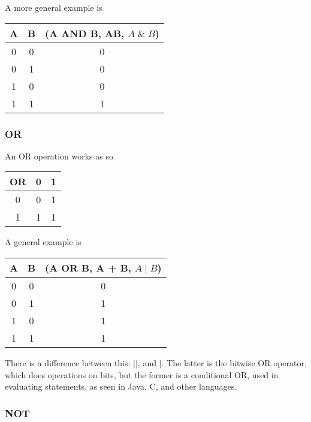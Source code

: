 \documentclass[12pt]{article}
\begin{document}
A more general example is

\begin{center}
    \begin{tabular}{|c|c|c|}
      \hline
      A & B & (A AND B, AB, $A \; \& \; B$) \\
      \hline
      0 & 0 & 0 \\
      \hline
      0 & 1 & 0 \\
      \hline
      1 & 0 & 0 \\
      \hline
      1 & 1 & 1 \\
      \hline
    \end{tabular}
    
\end{center}
\newpage
\subsubsection{OR}

An OR operation works as so

\begin{center}
    \begin{tabular}{|c|c|c|}
      \hline
      OR & 0 & 1 \\
      \hline
      0 & 0 & 1 \\
      \hline
      1 & 1 & 1 \\
      \hline
      
    \end{tabular}
\end{center}

A general example is

\begin{center}
    \begin{tabular}{|c|c|c|}
      \hline
      A & B & (A OR B, A + B, $A \; | \; B$) \\
      \hline
      0 & 0 & 0 \\
      \hline
      0 & 1 & 1 \\
      \hline
      1 & 0 & 1 \\
      \hline
      1 & 1 & 1 \\
      \hline
    \end{tabular}
\end{center}

There is a difference between this: $||$, and $|$. The latter is the bitwise OR
operator, which does operations on bits, but the former is a conditional OR,
used in evaluating statements, as seen in Java, C, and other languages.
\subsubsection{NOT}
\end{document}
